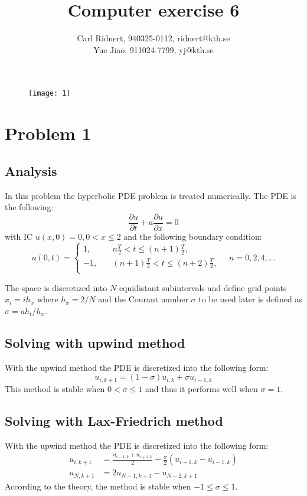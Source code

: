 \documentclass[11pt,a4paper,roman]{scrartcl}
\title{Computer exercise 6}
\date{}
\author{Carl Ridnert, 940325-0112, ridnert@kth.se \\
Yue Jiao, 911024-7799, yj@kth.se}
\begin{document}
\maketitle
\begin{figure}[h]
\centering
\texttt{[image: 1]}
\end{figure}


\newpage

\section*{Problem 1}
\subsection*{Analysis}
In this problem the hyperbolic PDE problem is treated numerically. The PDE is the following: 
\begin{equation}
\frac{\partial u}{\partial t} + a\frac{\partial u}{\partial x} = 0
\end{equation}
with IC $u(x,0)=0, 0<x\leq 2$ and the following boundary condition:
\begin{equation}
u(0,t) = \begin{cases}
1, \quad & n\frac{T}{2} < t \leq (n+1)\frac{T}{2},  \\
-1, \quad & (n+1)\frac{T}{2} < t \leq (n+2)\frac{T}{2}, \\
\end{cases} \quad n = 0,2,4,\dots
\end{equation}

The space is discretized into $N$ equidistant subintervals and define grid points $x_i = ih_x$ where $h_x = 2/N$ and the Courant number $\sigma$ to be used later is defined as $\sigma = ah_t/h_x$. 

\subsection*{Solving with upwind method}
With the upwind method the PDE is discretized into the following form:
\begin{equation}
u_{i,k+1} = (1-\sigma) u_{i,k} + \sigma u_{i-1,k}
\end{equation}
This method is stable when $0<\sigma \leq 1$ and thus it performs well when $\sigma = 1$. 

\subsection*{Solving with Lax-Friedrich method}
With the upwind method the PDE is discretized into the following form:
\begin{equation}
\begin{aligned}
u_{i,k+1} & = \frac{u_{i-1,k}+u_{i+1,k}}{2}- \frac{\sigma}{2}(u_{i+1,k}-u_{i-1,k}) \\
u_{N, k+1} & = 2u_{N-1, k+1} - u_{N-2, k+1}
\end{aligned}
\end{equation}
According to the theory, the method is stable when $-1\leq \sigma \leq 1$.
\end{document}
